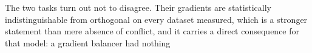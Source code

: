 The two tasks turn out not to disagree. Their gradients are statistically indistinguishable from
orthogonal on every dataset measured, which is a stronger statement than mere absence of
conflict, and it carries a direct consequence for that model: a gradient balancer had nothing
